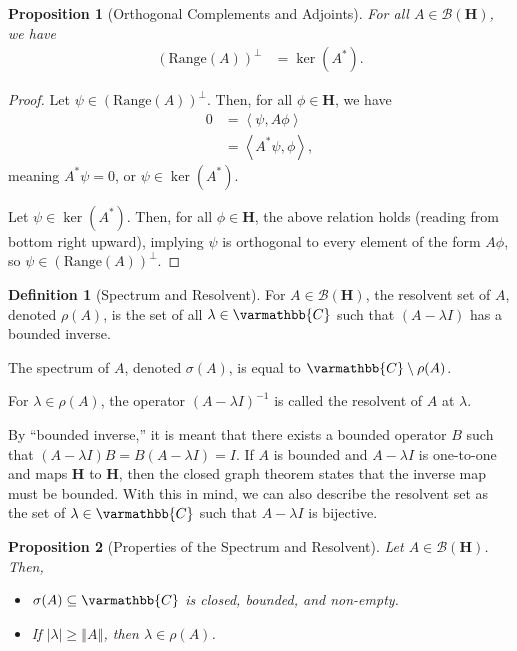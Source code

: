 \documentclass[12pt]{extarticle}
\newcommand{\C}{\varmathbb{C}}
\newcommand{\iprod}[2]{\left\langle #1,#2\right\rangle}
\newcommand{\norm}[1]{\left\Vert #1\right\Vert}
\theoremstyle{plain}
\newtheorem*{proposition}{Proposition}%
\theoremstyle{definition}
\newtheorem*{definition}{Definition}
\theoremstyle{remark}
\renewcommand{\newline}{\hfill\break}
\begin{document}
  \begin{proposition}[Orthogonal Complements and Adjoints]
  For all $A\in \mathcal{B}(\mathbf{H})$, we have
  \begin{align*}
    \left(\text{Range}(A)\right)^{\perp} &= \ker(A^{\ast}).
  \end{align*}
  \end{proposition}
  \begin{proof}
    Let $\psi \in \left(\text{Range}(A)\right)^{\perp}$. Then, for all $\phi \in \mathbf{H}$, we have
    \begin{align*}
      0 &= \iprod{\psi}{A\phi}\\
        &= \iprod{A^{\ast}\psi}{\phi},
    \end{align*}
    meaning $A^{\ast}\psi = 0$, or $\psi \in \ker(A^{\ast})$.\newline

    Let $\psi \in \ker(A^{\ast})$. Then, for all $\phi \in \mathbf{H}$, the above relation holds (reading from bottom right upward), implying $\psi$ is orthogonal to every element of the form $A\phi$, so $\psi \in \left(\text{Range}(A)\right)^{\perp}$.
  \end{proof}
  \begin{definition}[Spectrum and Resolvent]
    For $A\in \mathcal{B}(\mathbf{H})$, the resolvent set of $A$, denoted $\rho(A)$, is the set of all $\lambda \in \C$ such that $(A-\lambda I)$ has a bounded inverse.\newline

    The spectrum of $A$, denoted $\sigma(A)$, is equal to $\C\setminus \rho(A)$.\newline

    For $\lambda \in \rho(A)$, the operator $(A - \lambda I)^{-1}$ is called the resolvent of $A$ at $\lambda$.
  \end{definition}
  By ``bounded inverse,'' it is meant that there exists a bounded operator $B$ such that $\left(A - \lambda I\right) B = B \left(A - \lambda I\right) = I$. If $A$ is bounded and $A - \lambda I$ is one-to-one and maps $\mathbf{H}$ to $\mathbf{H}$, then the closed graph theorem states that the inverse map must be bounded. With this in mind, we can also describe the resolvent set as the set of $\lambda \in \C$ such that $A - \lambda I$ is bijective.
  \begin{proposition}[Properties of the Spectrum and Resolvent]
    Let $A\in \mathcal{B}\left(\mathbf{H}\right)$. Then,
    \begin{itemize}
      \item $\sigma(A)\subseteq \C$ is closed, bounded, and non-empty.
      \item If $|\lambda| \geq \norm{A}$, then $\lambda \in \rho(A)$.
    \end{itemize}
  \end{proposition}
\end{document}
